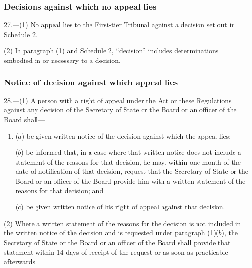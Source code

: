\documentclass[12pt,a4paper]{article}
\begin{document}
\subsubsection[27. Decisions against which no appeal lies]{Decisions against which no appeal lies}

27.—(1) No appeal lies to 
the First-tier Tribunal  %
against a decision set out in Schedule 2.

(2) In paragraph (1) and Schedule 2, “decision” includes determinations embodied in or necessary to a decision.



\subsubsection[28. Notice of decision against which appeal lies]{Notice of decision against which appeal lies}

28.—(1) A person with a right of appeal under the Act or these Regulations against any decision of the Secretary of State 
or the Board or an officer of the Board  %
shall—
\begin{enumerate}\item[]
($a$) be given written notice of the decision against which the appeal lies;

($b$) be informed that, in a case where that written notice does not include a statement of the reasons for that decision, he may, within one month of the date of notification of that decision, request that the Secretary of State 
or the Board or an officer of the Board  %
provide him with a written statement of the reasons for that decision; and

($c$) be given written notice of his right of appeal against that decision.
\end{enumerate}

(2) Where a written statement of the reasons for the decision is not included in the written notice of the decision and is requested under paragraph (1)($b$), the Secretary of State 
or the Board or an officer of the Board  %
shall provide that statement within 14 days of receipt of the request
or as soon as practicable afterwards.  %
\end{document}
